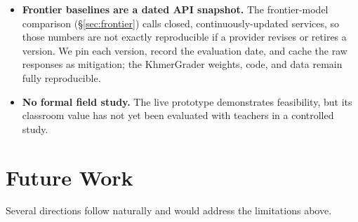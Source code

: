 \begin{itemize}[leftmargin=1.4em]
  than measures pedagogical usefulness.
  \item \textbf{Frontier baselines are a dated API snapshot.} The frontier-model comparison
  (\S\ref{sec:frontier}) calls closed, continuously-updated services, so those numbers are not exactly
  reproducible if a provider revises or retires a version. We pin each version, record the evaluation
  date, and cache the raw responses as mitigation; the KhmerGrader weights, code, and data remain fully
  reproducible.
  \item \textbf{No formal field study.} The live prototype demonstrates feasibility, but its classroom
  value has not yet been evaluated with teachers in a controlled study.
\end{itemize}

\section{Future Work}
\label{sec:future}
Several directions follow naturally and would address the limitations above.


